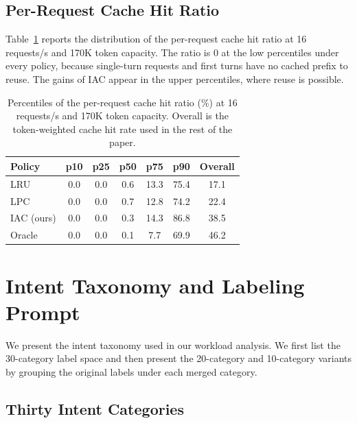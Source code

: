 \documentclass{article}
\begin{document}
\subsection{Per-Request Cache Hit Ratio}
Table~\ref{tab:cdf} reports the distribution of the per-request cache hit ratio at 16 requests/s and 170K token capacity. The ratio is 0 at the low percentiles under every policy, because single-turn requests and first turns have no cached prefix to reuse. The gains of IAC appear in the upper percentiles, where reuse is possible.

\begin{table}[h]
\centering
\caption{Percentiles of the per-request cache hit ratio (\%) at 16 requests/s and 170K token capacity. Overall is the token-weighted cache hit rate used in the rest of the paper.}
\label{tab:cdf}
\small
\begin{tabular}{lcccccc}
\toprule
Policy & p10 & p25 & p50 & p75 & p90 & Overall \\
\midrule
LRU        & 0.0 & 0.0 & 0.6 & 13.3 & 75.4 & 17.1 \\
LPC        & 0.0 & 0.0 & 0.7 & 12.8 & 74.2 & 22.4 \\
IAC (ours) & 0.0 & 0.0 & 0.3 & 14.3 & 86.8 & 38.5 \\
Oracle     & 0.0 & 0.0 & 0.1 & 7.7  & 69.9 & 46.2 \\
\bottomrule
\end{tabular}
\end{table}







\section{Intent Taxonomy and Labeling Prompt}
\label{app:intend_discover_pipeline}


We present the intent taxonomy used in our workload analysis. We first list the 30-category label space and then present the 20-category and 10-category variants by grouping the original labels under each merged category.


\subsection{Thirty Intent Categories}
\label{app:intent_30}
\end{document}
